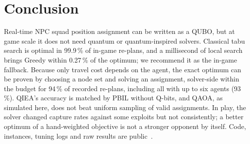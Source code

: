 \documentclass[sigconf]{acmart}
\begin{document}
\section{Conclusion}

Real-time NPC squad position assignment can be written as a QUBO, but at game scale it does not
need quantum or quantum-inspired solvers. Classical tabu search is optimal in 99.9\,\% of in-game re-plans, and a millisecond of
local search brings Greedy within 0.27\,\% of the optimum; we recommend it as the in-game fallback. Because only travel cost depends
on the agent, the exact optimum can be proven by choosing a node set and solving an assignment,
solver-side within the budget for 94\,\% of recorded re-plans, including all with up to six agents (93\,\%). QIEA's accuracy is matched by PBIL without Q-bits, and QAOA, as
simulated here, does not beat uniform sampling of valid assignments. In play, the solver changed
capture rates against some exploits but not consistently; a better optimum of a hand-weighted
objective is not a stronger opponent by itself. Code, instances, tuning
logs and raw results are public~\cite{ShadowValeSolver}.





\end{document}
